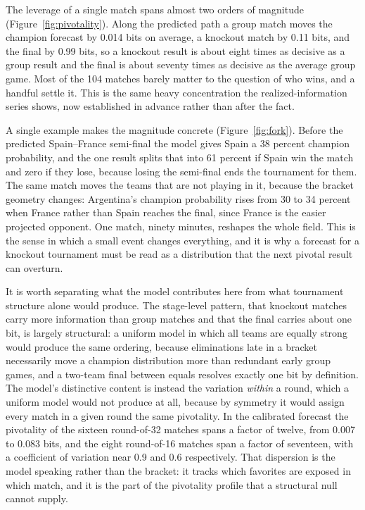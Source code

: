 \documentclass[11pt,letterpaper]{article}
\begin{document}
The leverage of a single match spans almost two orders of magnitude (Figure~\ref{fig:pivotality}). Along the predicted path a group match moves the champion forecast by 0.014 bits on average, a knockout match by 0.11 bits, and the final by 0.99 bits, so a knockout result is about eight times as decisive as a group result and the final is about seventy times as decisive as the average group game. Most of the 104 matches barely matter to the question of who wins, and a handful settle it. This is the same heavy concentration the realized-information series shows, now established in advance rather than after the fact.

A single example makes the magnitude concrete (Figure~\ref{fig:fork}). Before the predicted Spain--France semi-final the model gives Spain a 38 percent champion probability, and the one result splits that into 61 percent if Spain win the match and zero if they lose, because losing the semi-final ends the tournament for them. The same match moves the teams that are not playing in it, because the bracket geometry changes: Argentina's champion probability rises from 30 to 34 percent when France rather than Spain reaches the final, since France is the easier projected opponent. One match, ninety minutes, reshapes the whole field. This is the sense in which a small event changes everything, and it is why a forecast for a knockout tournament must be read as a distribution that the next pivotal result can overturn.

It is worth separating what the model contributes here from what tournament structure alone would produce. The stage-level pattern, that knockout matches carry more information than group matches and that the final carries about one bit, is largely structural: a uniform model in which all teams are equally strong would produce the same ordering, because eliminations late in a bracket necessarily move a champion distribution more than redundant early group games, and a two-team final between equals resolves exactly one bit by definition. The model's distinctive content is instead the variation \emph{within} a round, which a uniform model would not produce at all, because by symmetry it would assign every match in a given round the same pivotality. In the calibrated forecast the pivotality of the sixteen round-of-32 matches spans a factor of twelve, from 0.007 to 0.083 bits, and the eight round-of-16 matches span a factor of seventeen, with a coefficient of variation near 0.9 and 0.6 respectively. That dispersion is the model speaking rather than the bracket: it tracks which favorites are exposed in which match, and it is the part of the pivotality profile that a structural null cannot supply.
\end{document}

